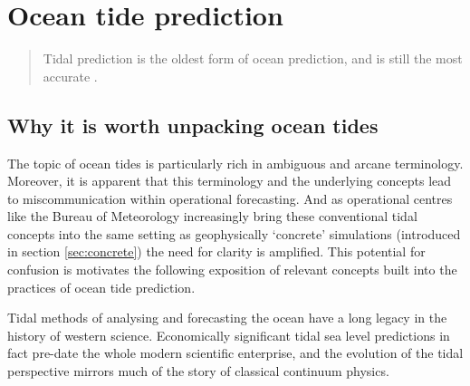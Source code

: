 \section{Ocean tide prediction}
\label{sec:tidesOverview}
\begin{quote}
Tidal prediction is the oldest form of ocean prediction, and is still the most accurate \citep{Parker:2007wq}. 
\end{quote}
\subsection{Why it is worth unpacking ocean tides}
\label{sec:semantics}
The topic of ocean tides is particularly rich in ambiguous and arcane terminology.  
Moreover, it is apparent that this terminology and the underlying concepts lead to miscommunication within operational forecasting.  And as operational centres like the Bureau of Meteorology increasingly bring these conventional tidal concepts into the same setting as geophysically `concrete' simulations (introduced in section \ref{sec:concrete}) the need for clarity is amplified.  This potential for confusion is motivates the following exposition of relevant concepts built into the practices of ocean tide prediction.
\newline{}


Tidal methods of analysing and forecasting the ocean have a long legacy in the history of western science.  Economically significant tidal sea level predictions in fact pre-date the whole modern scientific enterprise, and the evolution of the tidal perspective mirrors much of the story of classical continuum physics.


